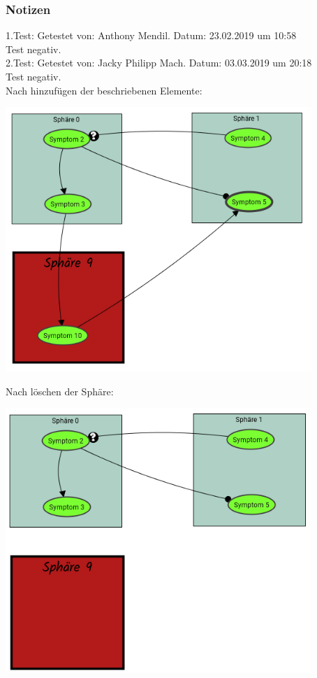 \documentclass[enabledeprecatedfontcommands]{scrartcl}
\begin{document}
\subsubsection{Notizen}
1.Test: Getestet von: Anthony Mendil. Datum: 23.02.2019 um 10:58 \\
Test negativ. \\
2.Test: Getestet von: Jacky Philipp Mach. Datum: 03.03.2019 um 20:18 \\
Test negativ.\\ 
Nach hinzufügen der beschriebenen Elemente: 
\begin{center}
\includegraphics[height=10cm]{2_20korrektvorher.PNG}
\end{center}
Nach löschen der Sphäre: 
\begin{center}
\includegraphics[height=10cm]{2_20korrektnachher.PNG}
\end{center}
\end{document}
